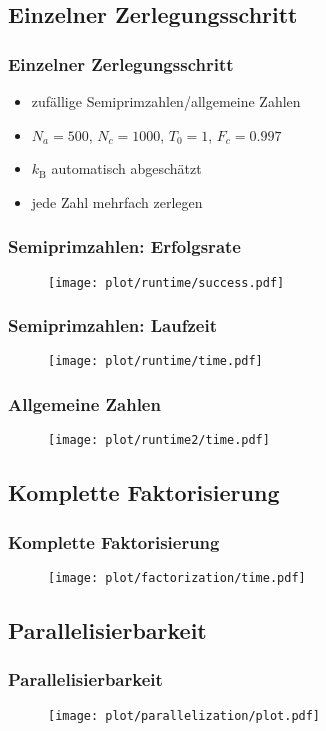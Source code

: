 \subsection*{Einzelner Zerlegungsschritt}
\begin{frame}
  \frametitle{Einzelner Zerlegungsschritt}
  \begin{itemize}
    \setlength{\itemsep}{0.3cm}

    \item zufällige Semiprimzahlen/allgemeine Zahlen
    \pause{}
    \item $N_a=500$, $N_c=1000$, $T_0=1$, $F_c=0.997$
    \item $k_\mathrm{B}$ automatisch abgeschätzt
    \pause{}
    \item jede Zahl mehrfach zerlegen
  \end{itemize}
\end{frame}
\begin{frame}
  \frametitle{Semiprimzahlen: Erfolgsrate}
  \begin{figure}[H]
    \centering
    \texttt{[image: plot/runtime/success.pdf]}
  \end{figure}
\end{frame}
\begin{frame}
  \frametitle{Semiprimzahlen: Laufzeit}
  \begin{figure}[H]
    \centering
    \texttt{[image: plot/runtime/time.pdf]}
  \end{figure}
\end{frame}
\begin{frame}
  \frametitle{Allgemeine Zahlen}
  \begin{figure}[H]
    \centering
    \texttt{[image: plot/runtime2/time.pdf]}
  \end{figure}
\end{frame}

\subsection*{Komplette Faktorisierung}
\begin{frame}
  \frametitle{Komplette Faktorisierung}
  \begin{figure}[H]
    \centering
    \texttt{[image: plot/factorization/time.pdf]}
  \end{figure}
\end{frame}

\subsection*{Parallelisierbarkeit}
\begin{frame}
  \frametitle{Parallelisierbarkeit}
  \begin{figure}[H]
    \centering
    \texttt{[image: plot/parallelization/plot.pdf]}
  \end{figure}
\end{frame}
